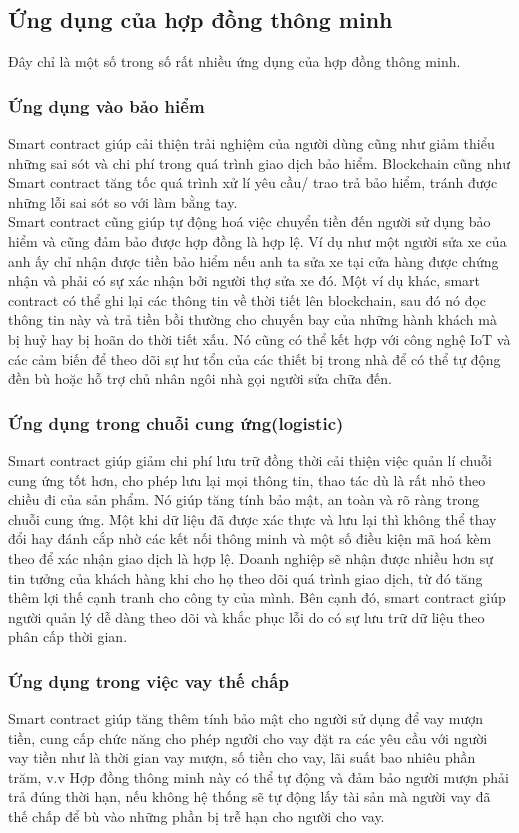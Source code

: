 \documentclass[a4paper]{article}
\begin{document}
\subsection{Ứng dụng của hợp đồng thông minh}
Đây chỉ là một số trong số rất nhiều ứng dụng của hợp đồng thông minh.
\subsubsection{Ứng dụng vào bảo hiểm}
Smart contract giúp cải thiện trải nghiệm của người dùng cũng như giảm thiểu những sai sót và chi phí trong quá trình giao dịch bảo hiểm. Blockchain cũng như Smart contract tăng tốc quá trình xử lí yêu cầu/ trao trả bảo hiểm, tránh được những lỗi sai sót so với làm bằng tay.\\
Smart contract cũng giúp tự động hoá việc chuyển tiền đến người sử dụng bảo hiểm và cũng đảm bảo được hợp đồng là hợp lệ. Ví dụ như một người sửa xe của anh ấy chỉ nhận được tiền bảo hiểm nếu anh ta sửa xe tại cửa hàng được chứng nhận và phải có sự xác nhận bởi người thợ sửa xe đó. Một ví dụ khác, smart contract có thể ghi lại các thông tin về thời tiết lên blockchain, sau đó nó đọc thông tin này và trả tiền bồi thường cho chuyến bay của những hành khách mà bị huỷ hay bị hoãn do thời tiết xấu. Nó cũng có thể kết hợp với công nghệ IoT và các cảm biến để theo dõi sự hư tổn của các thiết bị trong nhà để có thể tự động đền bù hoặc hỗ trợ chủ nhân ngôi nhà gọi người sửa chữa đến.

\subsubsection{Ứng dụng trong chuỗi cung ứng(logistic)}

Smart contract giúp giảm chi phí lưu trữ đồng thời cải thiện việc quản lí chuỗi cung ứng tốt hơn, cho phép lưu lại mọi thông tin, thao tác dù là rất nhỏ theo chiều đi của sản phẩm. Nó giúp tăng tính bảo mật, an toàn và rõ ràng trong chuỗi cung ứng. Một khi dữ liệu đã được xác thực và lưu lại thì không thể thay đổi hay đánh cắp nhờ các kết nối thông minh và một số điều kiện mã hoá kèm theo để xác nhận giao dịch là hợp lệ. Doanh nghiệp sẽ nhận được nhiều hơn sự tin tưởng của khách hàng khi cho họ theo dõi quá trình giao dịch, từ đó tăng thêm lợi thế cạnh tranh cho công ty của mình. Bên cạnh đó, smart contract giúp người quản lý dễ dàng theo dõi và khắc phục lỗi do có sự lưu trữ dữ liệu theo phân cấp thời gian.

\subsubsection{Ứng dụng trong việc vay thế chấp}
Smart contract giúp tăng thêm tính bảo mật cho người sử dụng để vay mượn tiền, cung cấp chức năng cho phép người cho vay đặt ra các yêu cầu với người vay tiền như là thời gian vay mượn, số tiền cho vay, lãi suất bao nhiêu phần trăm, v.v Hợp đồng thông minh này có thể tự động và đảm bảo người mượn phải trả đúng thời hạn, nếu không hệ thống sẽ tự động lấy tài sản mà người vay đã thế chấp để bù vào những phần bị trễ hạn cho người cho vay.\\
\end{document}
